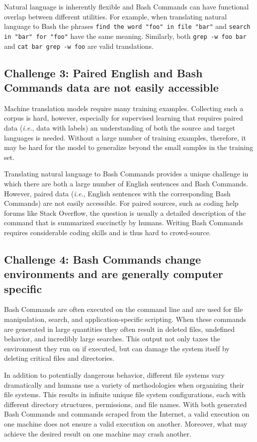 \documentclass{river-journal}
\begin{document}
Natural language is inherently flexible and Bash Commands can have functional overlap between different utilities. For example, when translating natural language to Bash the phrases \texttt{find the word "foo" in file "bar"} and \texttt{search in "bar" for "foo"} have the same meaning. Similarly, both \texttt{grep -w foo bar} and \texttt{cat bar  grep -w foo} are valid translations.

\subsection{\bf Challenge 3: Paired English and Bash Commands data are not easily accessible}
\label{lowresource.section}

Machine translation models require many training examples. Collecting such a corpus is hard, however, especially for supervised learning that requires paired data (\textit{i.e.}, data with labels) an understanding of both the source and target languages is needed. Without a large number of training examples, therefore, it may be hard for the model to generalize beyond the small samples in the training set. 

Translating natural language to Bash Commands provides a unique challenge in which there are both a large number of English sentences and Bash Commands. However, paired data (\textit{i.e.}, English sentences with the corresponding Bash Commands) are not easily accessible. For paired sources, such as coding help forums like Stack Overflow, the question is usually a detailed description of the command that is summarized succinctly by humans. Writing Bash Commands requires considerable coding skills and is thus hard to crowd-source.

\subsection{\bf Challenge 4: Bash Commands change environments and are generally computer specific}
\label{lowresource2.section}

Bash Commands are often executed on the command line and are used for file manipulation, search, and application-specific scripting. When these commands are generated in large quantities they often result in deleted files, undefined behavior, and incredibly large searches. This output not only taxes the environment they run on if executed, but can damage the system itself by deleting critical files and directories.

In addition to potentially dangerous behavior, different file systems vary dramatically and humans use a variety of methodologies when organizing their file systems. This results in infinite unique file system configurations, each with different directory structures, permissions, and file names. With both generated Bash Commands and commands scraped from the Internet, a valid execution on one machine does not ensure a valid execution on another. Moreover, what may achieve the desired result on one machine may crash another.
\end{document}
